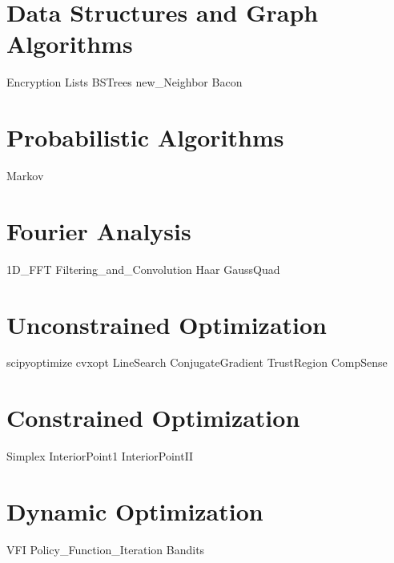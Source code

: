 \documentclass[nociteref]{SIAM-GH-book}
\begin{document}
\part{Data Structures and Graph Algorithms}
{Encryption}
{Lists}
{BSTrees}
{new_Neighbor}
{Bacon}
\part{Probabilistic Algorithms}
{Markov}
\part{Fourier Analysis}
{1D_FFT}
{Filtering_and_Convolution}
{Haar}
{GaussQuad}


\part{Unconstrained Optimization}
{scipyoptimize}
{cvxopt}
{LineSearch}
{ConjugateGradient}
{TrustRegion}
{CompSense}
\part{Constrained Optimization}
{Simplex}
{InteriorPoint1}
{InteriorPointII}
\part{Dynamic Optimization}
{VFI}
{Policy_Function_Iteration}
{Bandits}
\end{document}
